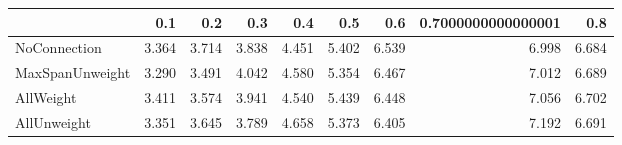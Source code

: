 \begin{tabular}{lrrrrrrrr}
\toprule
{} &   0.1 &   0.2 &   0.3 &   0.4 &   0.5 &   0.6 & 0.7000000000000001 &   0.8 \\
\midrule
NoConnection    & 3.364 & 3.714 & 3.838 & 4.451 & 5.402 & 6.539 &              6.998 & 6.684 \\
MaxSpanUnweight & 3.290 & 3.491 & 4.042 & 4.580 & 5.354 & 6.467 &              7.012 & 6.689 \\
AllWeight       & 3.411 & 3.574 & 3.941 & 4.540 & 5.439 & 6.448 &              7.056 & 6.702 \\
AllUnweight     & 3.351 & 3.645 & 3.789 & 4.658 & 5.373 & 6.405 &              7.192 & 6.691 \\
\bottomrule
\end{tabular}
